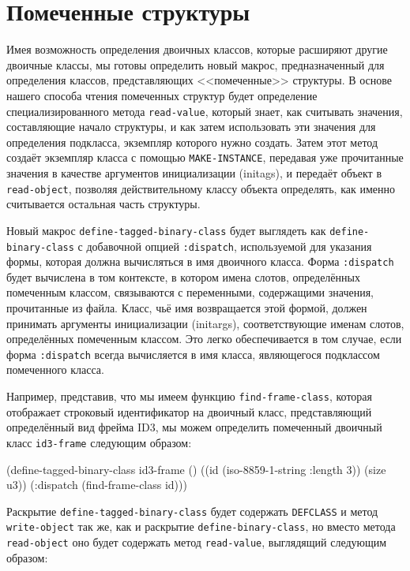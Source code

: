 \section{Помеченные структуры}

Имея возможность определения двоичных классов, которые расширяют другие двоичные классы,
мы готовы определить новый макрос, предназначенный для определения классов, представляющих
<<помеченные>> структуры. В основе нашего способа чтения помеченных структур будет
определение специализированного метода \lstinline{read-value}, который знает, как считывать
значения, составляющие начало структуры, и как затем использовать эти значения для
определения подкласса, экземпляр которого нужно создать. Затем этот метод создаёт
экземпляр класса с помощью \lstinline{MAKE-INSTANCE}, передавая уже прочитанные значения в
качестве аргументов инициализации (initags), и передаёт объект в \lstinline{read-object},
позволяя действительному классу объекта определять, как именно считывается остальная часть
структуры.

Новый макрос \lstinline{define-tagged-binary-class} будет выглядеть как
\lstinline{define-binary-class} с добавочной опцией \lstinline{:dispatch}, используемой для указания
формы, которая должна вычисляться в имя двоичного класса. Форма \lstinline{:dispatch} будет
вычислена в том контексте, в котором имена слотов, определённых помеченным классом,
связываются с переменными, содержащими значения, прочитанные из файла. Класс, чьё имя
возвращается этой формой, должен принимать аргументы инициализации (initargs),
соответствующие именам слотов, определённых помеченным классом. Это легко обеспечивается в
том случае, если форма \lstinline{:dispatch} всегда вычисляется в имя класса, являющегося
подклассом помеченного класса.

Например, представив, что мы имеем функцию \lstinline{find-frame-class}, которая отображает
строковый идентификатор на двоичный класс, представляющий определённый вид фрейма ID3, мы
можем определить помеченный двоичный класс \lstinline{id3-frame} следующим образом:

\begin{myverb}
(define-tagged-binary-class id3-frame ()
  ((id   (iso-8859-1-string :length 3))
   (size u3))
  (:dispatch (find-frame-class id)))
\end{myverb}

Раскрытие \lstinline{define-tagged-binary-class} будет содержать \lstinline{DEFCLASS} и метод \lstinline{write-object} так же, как и раскрытие \lstinline{define-binary-class}, но вместо метода \lstinline{read-object} оно будет содержать метод \lstinline{read-value}, выглядящий следующим образом:

